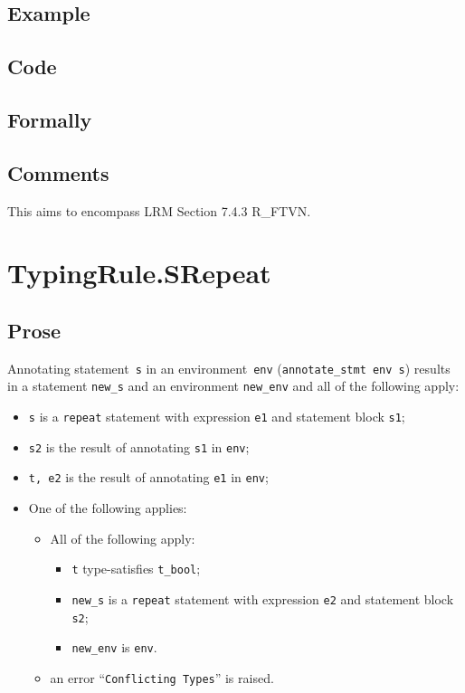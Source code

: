 \documentclass{book}
\begin{document}
  \subsection{Example}

  \subsection{Code}

\begin{emptyformal}
    \subsection{Formally}
\end{emptyformal}

\subsection{Comments}
    This aims to encompass LRM Section 7.4.3 R\_FTVN.

\section{TypingRule.SRepeat \label{sec:TypingRule.SRepeat}}

  \subsection{Prose}
Annotating statement~\texttt{s} in an environment~\texttt{env}
(\texttt{annotate\_stmt env s}) results in a statement \texttt{new\_s} and an
environment \texttt{new\_env} and all of the following apply:
   \begin{itemize}
   \item \texttt{s} is a \texttt{repeat} statement with expression \texttt{e1} and statement block \texttt{s1};
   \item \texttt{s2} is the result of annotating \texttt{s1} in \texttt{env};
   \item \texttt{t, e2} is the result of annotating \texttt{e1} in \texttt{env};
   \item One of the following applies:
     \begin{itemize}
     \item All of the following apply:
       \begin{itemize}
       \item \texttt{t} type-satisfies \texttt{t\_bool}; 
       \item \texttt{new\_s} is a \texttt{repeat} statement with expression \texttt{e2} and statement block \texttt{s2};
       \item \texttt{new\_env} is \texttt{env}.
       \end{itemize}
     \item an error ``\texttt{Conflicting Types}'' is raised.
     \end{itemize}
   \end{itemize}
\end{document}
